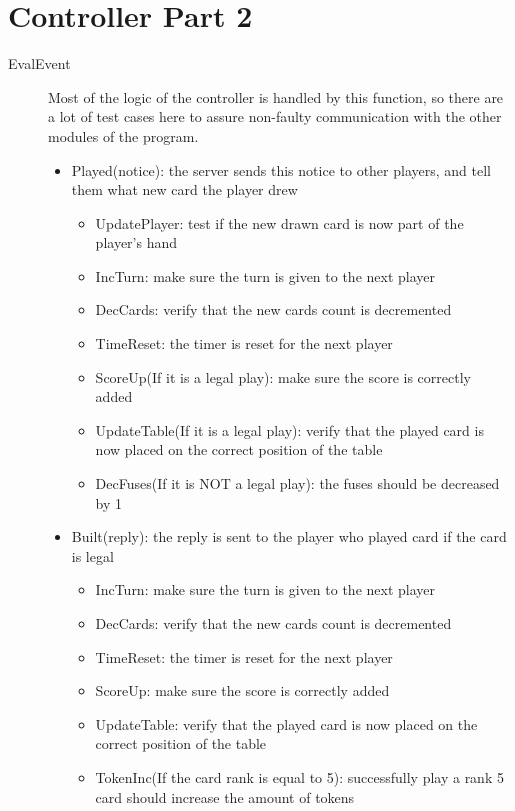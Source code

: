 \section{Controller Part 2}
\begin{description}
	\item[EvalEvent]  Most of the logic of the controller is handled by this function, so there are a lot of test cases here to assure non-faulty communication with the other modules of the program. 
	\begin{itemize}
		\item Played(notice): the server sends this notice to other players, and tell them what new card the player drew 
			\begin{itemize}
		    	\item UpdatePlayer: test if the new drawn card is now part of the player's hand
		    	\item IncTurn: make sure the turn is given to the next player
		    	\item DecCards: verify that the new cards count is decremented
		    	\item TimeReset: the timer is reset for the next player
			\item ScoreUp(If it is a legal play): make sure the score is correctly added
			\item UpdateTable(If it is a legal play): verify that the played card is now placed on the correct position of the table
			\item DecFuses(If it is NOT a legal play): the fuses should be decreased by 1
    			\end{itemize}
		\item Built(reply): the reply is sent to the player who played card if the card is legal
			\begin{itemize}
		    	\item IncTurn: make sure the turn is given to the next player
		    	\item DecCards: verify that the new cards count is decremented
		    	\item TimeReset: the timer is reset for the next player
			\item ScoreUp: make sure the score is correctly added
			\item UpdateTable: verify that the played card is now placed on the correct position of the table
			\item TokenInc(If the card rank is equal to 5): successfully play a rank 5 card should increase the amount of tokens
    			\end{itemize}

\end{itemize}
\end{description}
